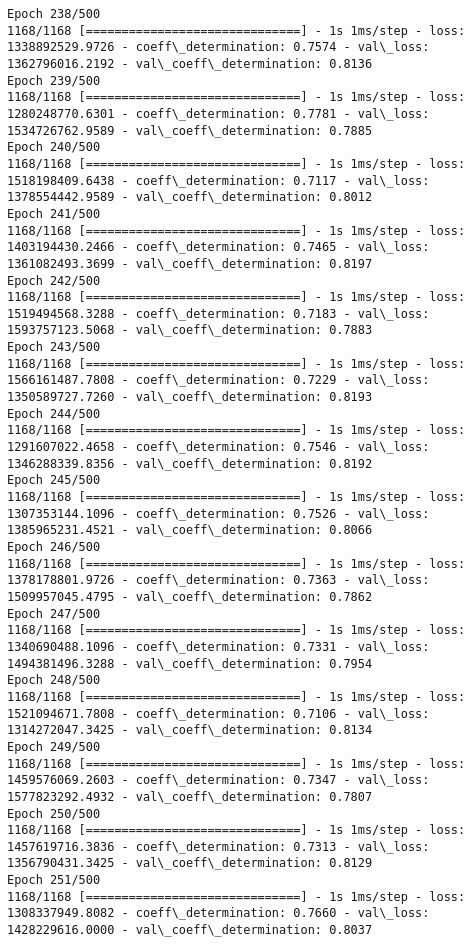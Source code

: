 \documentclass[11pt]{article}
\begin{document}
\begin{Verbatim}[commandchars=\\\{\}]
Epoch 238/500
1168/1168 [==============================] - 1s 1ms/step - loss: 1338892529.9726 - coeff\_determination: 0.7574 - val\_loss: 1362796016.2192 - val\_coeff\_determination: 0.8136
Epoch 239/500
1168/1168 [==============================] - 1s 1ms/step - loss: 1280248770.6301 - coeff\_determination: 0.7781 - val\_loss: 1534726762.9589 - val\_coeff\_determination: 0.7885
Epoch 240/500
1168/1168 [==============================] - 1s 1ms/step - loss: 1518198409.6438 - coeff\_determination: 0.7117 - val\_loss: 1378554442.9589 - val\_coeff\_determination: 0.8012
Epoch 241/500
1168/1168 [==============================] - 1s 1ms/step - loss: 1403194430.2466 - coeff\_determination: 0.7465 - val\_loss: 1361082493.3699 - val\_coeff\_determination: 0.8197
Epoch 242/500
1168/1168 [==============================] - 1s 1ms/step - loss: 1519494568.3288 - coeff\_determination: 0.7183 - val\_loss: 1593757123.5068 - val\_coeff\_determination: 0.7883
Epoch 243/500
1168/1168 [==============================] - 1s 1ms/step - loss: 1566161487.7808 - coeff\_determination: 0.7229 - val\_loss: 1350589727.7260 - val\_coeff\_determination: 0.8193
Epoch 244/500
1168/1168 [==============================] - 1s 1ms/step - loss: 1291607022.4658 - coeff\_determination: 0.7546 - val\_loss: 1346288339.8356 - val\_coeff\_determination: 0.8192
Epoch 245/500
1168/1168 [==============================] - 1s 1ms/step - loss: 1307353144.1096 - coeff\_determination: 0.7526 - val\_loss: 1385965231.4521 - val\_coeff\_determination: 0.8066
Epoch 246/500
1168/1168 [==============================] - 1s 1ms/step - loss: 1378178801.9726 - coeff\_determination: 0.7363 - val\_loss: 1509957045.4795 - val\_coeff\_determination: 0.7862
Epoch 247/500
1168/1168 [==============================] - 1s 1ms/step - loss: 1340690488.1096 - coeff\_determination: 0.7331 - val\_loss: 1494381496.3288 - val\_coeff\_determination: 0.7954
Epoch 248/500
1168/1168 [==============================] - 1s 1ms/step - loss: 1521094671.7808 - coeff\_determination: 0.7106 - val\_loss: 1314272047.3425 - val\_coeff\_determination: 0.8134
Epoch 249/500
1168/1168 [==============================] - 1s 1ms/step - loss: 1459576069.2603 - coeff\_determination: 0.7347 - val\_loss: 1577823292.4932 - val\_coeff\_determination: 0.7807
Epoch 250/500
1168/1168 [==============================] - 1s 1ms/step - loss: 1457619716.3836 - coeff\_determination: 0.7313 - val\_loss: 1356790431.3425 - val\_coeff\_determination: 0.8129
Epoch 251/500
1168/1168 [==============================] - 1s 1ms/step - loss: 1308337949.8082 - coeff\_determination: 0.7660 - val\_loss: 1428229616.0000 - val\_coeff\_determination: 0.8037

\end{Verbatim}
\end{document}
